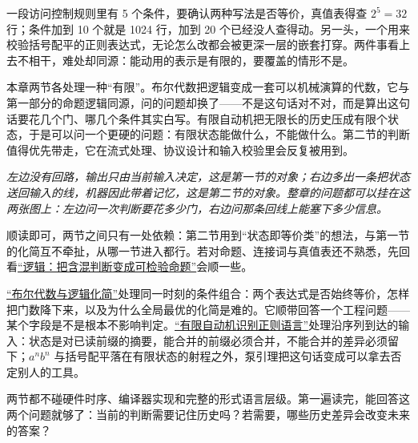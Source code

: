 一段访问控制规则里有 5 个条件，要确认两种写法是否等价，真值表得查 \(2^5=32\) 行；条件加到 10 个就是 1024 行，加到 20 个已经没人查得动。另一头，一个用来校验括号配平的正则表达式，无论怎么改都会被更深一层的嵌套打穿。两件事看上去不相干，难处却同源：能动用的表示是有限的，要覆盖的情形不是。

本章两节各处理一种``有限''。布尔代数把逻辑变成一套可以机械演算的代数，它与第一部分的命题逻辑同源，问的问题却换了——不是这句话对不对，而是算出这句话要花几个门、哪几个条件其实白写。有限自动机把无限长的历史压成有限个状态，于是可以问一个更硬的问题：有限状态能做什么，不能做什么。第二节的判断值得优先带走，它在流式处理、协议设计和输入校验里会反复被用到。

\begin{center}

\emph{左边没有回路，输出只由当前输入决定，这是第一节的对象；右边多出一条把状态送回输入的线，机器因此带着记忆，这是第二节的对象。整章的问题都可以挂在这两张图上：左边问一次判断要花多少门，右边问那条回线上能塞下多少信息。}
\end{center}

顺读即可，两节之间只有一处依赖：第二节用到``状态即等价类''的想法，与第一节的化简互不牵扯，从哪一节进入都行。若对命题、连接词与真值表还不熟悉，先回看\hyperref[ch:004]{``逻辑：把含混判断变成可检验命题''}会顺一些。

\hyperref[sec:04-Discrete-Mathematics/07-Boolean-Algebra-and-Automata/01]{``布尔代数与逻辑化简''}处理同一时刻的条件组合：两个表达式是否始终等价，怎样把门数降下来，以及为什么全局最优的化简是难的。它顺带回答一个工程问题——某个字段是不是根本不影响判定。\hyperref[sec:04-Discrete-Mathematics/07-Boolean-Algebra-and-Automata/02]{``有限自动机识别正则语言''}处理沿序列到达的输入：状态是对已读前缀的摘要，能合并的前缀必须合并，不能合并的差异必须留下；\(a^nb^n\) 与括号配平落在有限状态的射程之外，泵引理把这句话变成可以拿去否定别人的工具。

两节都不碰硬件时序、编译器实现和完整的形式语言层级。第一遍读完，能回答这两个问题就够了：当前的判断需要记住历史吗？若需要，哪些历史差异会改变未来的答案？
